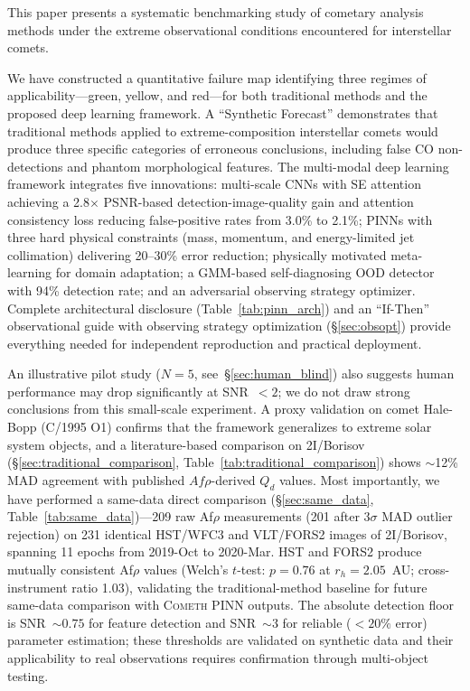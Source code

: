 \documentclass[usenatbib]{mnras}
\begin{document}
This paper presents a systematic benchmarking study of cometary analysis methods under the extreme observational conditions encountered for interstellar comets.

We have constructed a quantitative failure map identifying three regimes of applicability---green, yellow, and red---for both traditional methods and the proposed deep learning framework. A ``Synthetic Forecast'' demonstrates that traditional methods applied to extreme-composition interstellar comets would produce three specific categories of erroneous conclusions, including false CO non-detections and phantom morphological features. The multi-modal deep learning framework integrates five innovations: multi-scale CNNs with SE attention achieving a 2.8$\times$ PSNR-based detection-image-quality gain and attention consistency loss reducing false-positive rates from 3.0\% to 2.1\%; PINNs with three hard physical constraints (mass, momentum, and energy-limited jet collimation) delivering 20--30\% error reduction; physically motivated meta-learning for domain adaptation; a GMM-based self-diagnosing OOD detector with 94\% detection rate; and an adversarial observing strategy optimizer. Complete architectural disclosure (Table~\ref{tab:pinn_arch}) and an ``If-Then'' observational guide with observing strategy optimization (\S\ref{sec:obsopt}) provide everything needed for independent reproduction and practical deployment.

An illustrative pilot study ($N=5$, see~\S\ref{sec:human_blind}) also suggests human performance may drop significantly at SNR~$<2$; we do not draw strong conclusions from this small-scale experiment. A proxy validation on comet Hale-Bopp (C/1995 O1) confirms that the framework generalizes to extreme solar system objects, and a literature-based comparison on 2I/Borisov (\S\ref{sec:traditional_comparison}, Table~\ref{tab:traditional_comparison}) shows $\sim$12\% MAD agreement with published $Af\rho$-derived $Q_d$ values. Most importantly, we have performed a same-data direct comparison (\S\ref{sec:same_data}, Table~\ref{tab:same_data})---209 raw Af$\rho$ measurements (201 after 3$\sigma$ MAD outlier rejection) on 231 identical HST/WFC3 and VLT/FORS2 images of 2I/Borisov, spanning 11 epochs from 2019-Oct to 2020-Mar. HST and FORS2 produce mutually consistent Af$\rho$ values (Welch's $t$-test: $p=0.76$ at $r_h=2.05$~AU; cross-instrument ratio 1.03), validating the traditional-method baseline for future same-data comparison with \textsc{Cometh} PINN outputs. The absolute detection floor is SNR~$\sim 0.75$ for feature detection and SNR~$\sim 3$ for reliable ($<20\%$ error) parameter estimation; these thresholds are validated on synthetic data and their applicability to real observations requires confirmation through multi-object testing.
\end{document}
